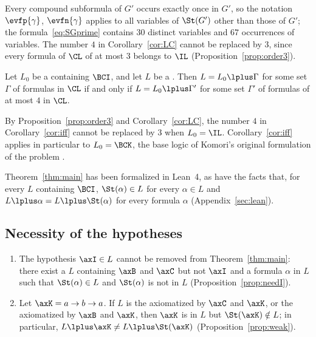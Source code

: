 Every compound subformula of $G'$ occurs exactly once in $G'$, so the
notation $\evfp{\gamma}$, $\evfn{\gamma}$ applies to all variables of
$\St(G')$ other than those of $G'$; the formula~\eqref{eq:SGprime} contains
$30$ distinct variables and $67$ occurrences of variables. The number $4$ in Corollary~\ref{cor:LC} cannot
be replaced by $3$, since every formula of $\CL$ of  at most $3$
belongs to $\IL$ (Proposition~\ref{prop:order3}).

\begin{corollary}\label{cor:iff}
Let $L_0$ be a  containing $\BCI$, and let $L$ be a .
Then $L=L_0\lplus\Gamma$ for some set $\Gamma$ of formulas  in
$\CL$ if and only if $L=L_0\lplus\Gamma'$ for some set $\Gamma'$ of formulas
of  at most $4$  in $\CL$.
\end{corollary}

By Proposition~\ref{prop:order3} and Corollary~\ref{cor:LC}, the number
$4$ in Corollary~\ref{cor:iff} cannot be replaced by $3$ when $L_0=\IL$.
Corollary~\ref{cor:iff} applies in particular to $L_0=\BCK$, the base
logic of Komori's original formulation of the problem
\cite[footnote~1]{NM21}.

Theorem~\ref{thm:main} has been formalized in Lean~4, as have the facts
that, for every  $L$ containing $\BCI$, $\St(\alpha)\in L$ for
every $\alpha\in L$ and $L\lplus\alpha=L\lplus\St(\alpha)$ for every
formula $\alpha$ (Appendix~\ref{sec:lean}).

\subsection{Necessity of the hypotheses}

\begin{theorem}[informal]
\leavevmode
\begin{enumerate}
\item[(a)] The hypothesis $\axI\in L$ cannot be removed from
  Theorem~\ref{thm:main}: there exist a  $L$ containing $\axB$
  and $\axC$ but not $\axI$ and a formula $\alpha$  in $L$ such that
  $\St(\alpha)\in L$ and $\St(\alpha)$ is not  in $L$
  (Proposition~\ref{prop:needI}).
\item[(b)] Let $\axK=a\to b\to a$. If $L$ is the  axiomatized
  by $\axC$ and $\axK$, or the  axiomatized by $\axB$ and $\axK$,
  then $\axK$ is  in $L$ but $\St(\axK)\notin L$; in particular,
  $L\lplus\axK\neq L\lplus\St(\axK)$ (Proposition~\ref{prop:weak}).
\end{enumerate}
\end{theorem}

